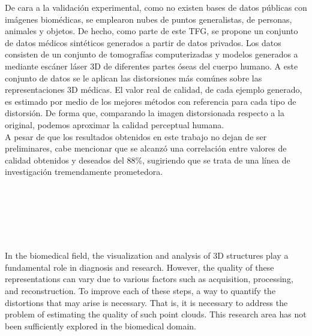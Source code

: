 De cara a la validación experimental, como no existen bases de datos públicas con imágenes 
biomédicas, se emplearon nubes de puntos generalistas, de personas, animales y objetos. 
De hecho, como parte de este TFG, se propone un conjunto de datos médicos sintéticos 
generados a partir de datos privados. 
Los datos consisten de un conjunto de tomografías computerizadas y modelos 
generados a mediante escáner láser 3D de diferentes partes óseas del cuerpo 
humano. A este conjunto de datos se le aplican las distorsiones más comúnes 
sobre las representaciones 3D médicas. 
El valor real de calidad, de cada ejemplo generado, es estimado por medio de 
los mejores métodos con referencia para cada tipo de distorsión. De forma que, 
comparando la imagen distorsionada respecto a la original, 
podemos aproximar la calidad perceptual humana.
\\

A pesar de que los resultados obtenidos en este trabajo no dejan de ser preliminares, 
cabe mencionar que se alcanzó una correlación entre valores de calidad obtenidos y 
deseados del 88\%, sugiriendo que se trata de una línea de investigación tremendamente 
prometedora. 

\cleardoublepage


\thispagestyle{empty}


\begin{center}
{\large\bfseries \myTitleENG}\\
\end{center}
\begin{center}
\myName \\
\end{center}

\\

\\

In the biomedical field, the visualization and analysis of 3D structures play 
a fundamental role in diagnosis and research. However, the quality of these 
representations can vary due to various factors such as acquisition, processing, 
and reconstruction. To improve each of these steps, a way to quantify the distortions 
that may arise is necessary. That is, it is necessary to address the problem of 
estimating the quality of such point clouds. This research area has not been 
sufficiently explored in the biomedical domain.
\\

